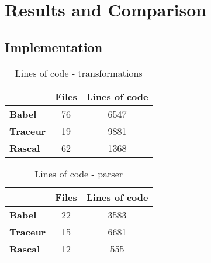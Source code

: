 
\chapter{Results and Comparison} %

\label{Chapter4}


\section{Implementation}

\begin{table}[h]
\centering
\caption{Lines of code - transformations}
\label{loc-transformations}
\begin{tabular}{@{}lcc@{}}
\toprule
              & {\bf Files} & \multicolumn{1}{l}{{\bf Lines of code}} \\ \midrule
{\bf Babel}   & 76          & 6547                                    \\
{\bf Traceur} & 19          & 9881                                    \\
{\bf Rascal}  & 62          & 1368                                    \\ \bottomrule
\end{tabular}
\end{table}

\begin{table}[h]
\centering
\caption{Lines of code - parser}
\label{loc-parser}
\begin{tabular}{@{}lcc@{}}
\toprule
              & {\bf Files} & \multicolumn{1}{l}{{\bf Lines of code}} \\ \midrule
{\bf Babel}   & 22          & 3583                                    \\
{\bf Traceur} & 15          & 6681                                    \\
{\bf Rascal}  & 12          & 555                                    \\ \bottomrule
\end{tabular}
\end{table}


